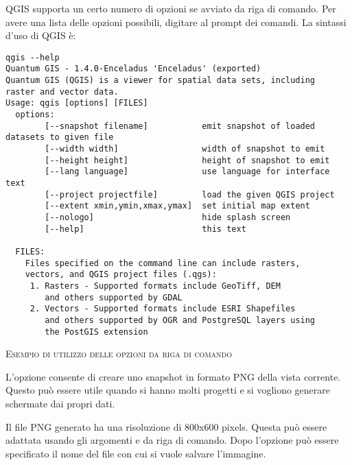 \nix QGIS supporta un certo numero di opzioni se avviato da riga di comando.
Per avere una lista delle opzioni possibili, digitare  al prompt dei comandi.
La sintassi d'uso di QGIS è:

\small
\begin{verbatim}
qgis --help
Quantum GIS - 1.4.0-Enceladus 'Enceladus' (exported)
Quantum GIS (QGIS) is a viewer for spatial data sets, including
raster and vector data.
Usage: qgis [options] [FILES]
  options:
        [--snapshot filename]           emit snapshot of loaded datasets to given file
        [--width width]                 width of snapshot to emit
        [--height height]               height of snapshot to emit
        [--lang language]               use language for interface text
        [--project projectfile]         load the given QGIS project
        [--extent xmin,ymin,xmax,ymax]  set initial map extent
        [--nologo]                      hide splash screen
        [--help]                        this text

  FILES:
    Files specified on the command line can include rasters,
    vectors, and QGIS project files (.qgs):
     1. Rasters - Supported formats include GeoTiff, DEM
        and others supported by GDAL
     2. Vectors - Supported formats include ESRI Shapefiles
        and others supported by OGR and PostgreSQL layers using
        the PostGIS extension
\end{verbatim}
\normalsize

\begin{Tip} \caption{\textsc{Esempio di utilizzo delle opzioni da riga di comando}}
\end{Tip}

L'opzione consente di creare uno snapshot in formato PNG della vista corrente.
Questo può essere utile quando si hanno molti progetti e si vogliono
generare schermate dai propri dati.

Il file PNG generato ha una risoluzione di 800x600 pixels. Questa può essere adattata
usando gli argomenti  e  da riga di comando. 
Dopo l'opzione  può essere specificato il nome del file con cui si vuole salvare l'immagine.

